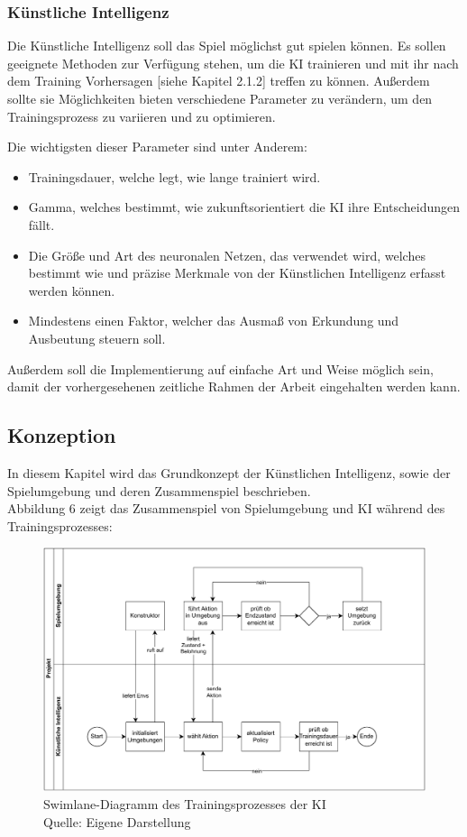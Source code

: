 \subsubsection{Künstliche Intelligenz}
Die Künstliche Intelligenz soll das Spiel möglichst gut spielen können. Es sollen geeignete Methoden zur Verfügung stehen, um die KI trainieren und mit ihr nach dem Training Vorhersagen [siehe Kapitel 2.1.2] treffen zu können. Außerdem sollte sie Möglichkeiten bieten verschiedene Parameter zu verändern, um den Trainingsprozess zu variieren und zu optimieren. 

Die wichtigsten dieser Parameter sind unter Anderem:
\begin{itemize} 
\item Trainingsdauer, welche  legt, wie lange trainiert wird.
\item Gamma, welches bestimmt, wie zukunftsorientiert die KI ihre Entscheidungen fällt. 
\item Die Größe und Art des neuronalen Netzen, das verwendet wird, welches bestimmt wie und präzise Merkmale von der Künstlichen Intelligenz erfasst werden können. 
\item Mindestens einen Faktor, welcher das Ausmaß von Erkundung und Ausbeutung steuern soll. 
\end{itemize}
Außerdem soll die Implementierung auf einfache Art und Weise möglich sein, damit der vorhergesehenen zeitliche Rahmen der Arbeit eingehalten werden kann.
\subsection{Konzeption}
In diesem Kapitel wird das Grundkonzept der Künstlichen Intelligenz, sowie der Spielumgebung und deren Zusammenspiel beschrieben.\\

Abbildung 6 zeigt das Zusammenspiel von Spielumgebung und KI während des Trainingsprozesses:

\nopagebreak
\begin{figure}[H]
	\includegraphics[width=1\textwidth]{Bilder/swimlane.drawio.pdf} 
	\caption[Swimlane-Diagramm des Trainingsprozesses der KI]{Swimlane-Diagramm des Trainingsprozesses der KI\\ Quelle: Eigene Darstellung}
\end{figure}	

